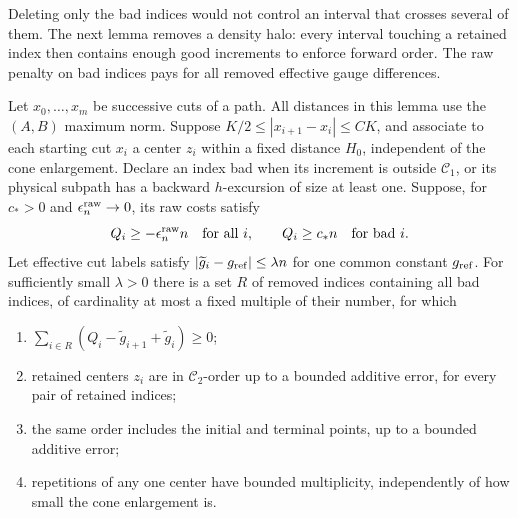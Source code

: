 Deleting only the bad indices would not control an interval that
crosses several of them. The next lemma removes a density halo:
every interval touching a retained index then contains enough good
increments to enforce forward order. The raw penalty on bad indices
pays for all removed effective gauge differences.

\begin{lemma}
\label{links:halos}
Let \(x_0,\ldots,x_m\) be successive cuts of a path. All distances
in this lemma use the \((A,B)\) maximum norm. Suppose
\(K/2\le|x_{i+1}-x_i|\le CK\), and associate to each starting cut
\(x_i\) a center \(z_i\) within a fixed distance \(H_0\), independent
of the cone enlargement. Declare an index bad when its
increment is outside \(\mathcal C_1\), or its physical subpath has
a backward \(h\)-excursion of size at least one. Suppose, for
\(c_*>0\) and \(\epsilon_n^{\rm raw}\to0\), its raw costs satisfy
\[
 Q_i\ge-\epsilon_n^{\rm raw}n\quad\hbox{for all }i,
 \qquad Q_i\ge c_*n\quad\hbox{for bad }i.
\]
Let effective cut labels satisfy
\(|\widetilde g_i-g_{\rm ref}|\le\lambda n\) for one common constant
\(g_{\rm ref}\). For sufficiently small \(\lambda>0\) there is a set
\(R\) of removed indices containing all bad indices, of cardinality
at most a fixed multiple of their number, for which
\begin{enumerate}
\item \(\sum_{i\in R}(Q_i-\widetilde g_{i+1}+\widetilde g_i)\ge0\);
\item retained centers \(z_i\) are in \(\mathcal C_2\)-order up to a bounded
additive error, for every pair of retained indices;
\item the same order includes the initial and terminal points, up to
a bounded additive error;
\item repetitions of any one center have bounded multiplicity, independently of how
small the cone enlargement is.
\end{enumerate}
\end{lemma}

